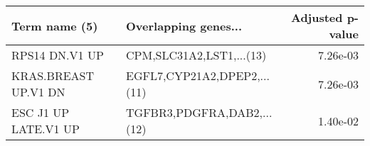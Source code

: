 \begin{tabular}{llr}
\toprule
       Term name (5) &        Overlapping genes... &  Adjusted p-value \\
\midrule
      RPS14 DN.V1 UP &    CPM,SLC31A2,LST1,...(13) &          7.26e-03 \\
KRAS.BREAST UP.V1 DN & EGFL7,CYP21A2,DPEP2,...(11) &          7.26e-03 \\
ESC J1 UP LATE.V1 UP &  TGFBR3,PDGFRA,DAB2,...(12) &          1.40e-02 \\
\bottomrule
\end{tabular}
